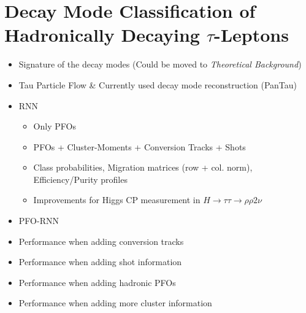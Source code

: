 \chapter{Decay Mode Classification of Hadronically Decaying $\tau$-Leptons}
\label{sec:decaymode}

\begin{itemize}
\item Signature of the decay modes (Could be moved to \textit{Theoretical
    Background})
\item Tau Particle Flow \& Currently used decay mode reconstruction (PanTau)
\item RNN
  \begin{itemize}
  \item Only PFOs
  \item PFOs + Cluster-Moments + Conversion Tracks + Shots
  \item Class probabilities, Migration matrices (row + col. norm),
    Efficiency/Purity profiles
  \item Improvements for Higgs CP measurement in
    $H \rightarrow \tau\tau \rightarrow \rho \rho 2\nu$
  \end{itemize}
\end{itemize}

\begin{itemize}
\item PFO-RNN

\item Performance when adding conversion tracks

\item Performance when adding shot information

\item Performance when adding hadronic PFOs

\item Performance when adding more cluster information

\end{itemize}


